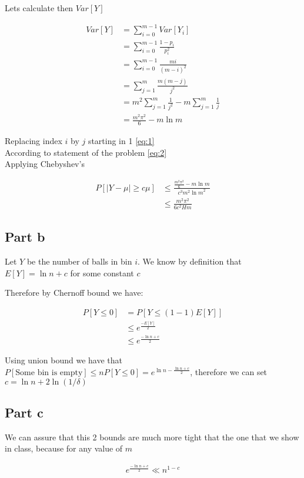 \documentclass[12pt, a4paper]{article}
\begin{document}
Lets calculate then $Var[Y]$

\begin{subequations}
  \begin{align}
  Var[Y] &= \sum_{i=0}^{m-1} Var[Y_i]\\
         &= \sum_{i=0}^{m-1} \frac{1 - p_i}{p_i^2}\\
         &= \sum_{i=0}^{m-1} \frac{mi}{(m - i)^2}\\
         &= \sum_{j=1}^{m} \frac{m(m - j)}{j^2}\label{eq:1} \\
         &= m^2 \sum_{j=1}^{m} \frac{1}{j^2} - m \sum_{j=1}^{m} \frac{1}{j}\label{eq:2}\\
         &= \frac{m^2 \pi^2}{6} - m\ln{m}
  \end{align}
\end{subequations}

Replacing index $i$ by $j$ starting in 1 \ref{eq:1}\\
According to statement of the problem \ref{eq:2}\\

Applying Chebyshev's

\begin{align*}
  P[|Y - \mu| \geq c \mu] &\leq \frac{\frac{m^2 \pi^2}{6} - m\ln{m}}{c^3m^2{\ln{m}}^2}\\
                          &\leq \frac{m^2 \pi^2}{6c^2Hm}
\end{align*}

\subsection{Part b}
Let $Y$ be the number of balls in bin $i$. We know by definition that $E[Y] =
\ln{n} + c$ for some constant $c$

Therefore by Chernoff bound we have:

\begin{align*}
  P[Y \leq 0] &= P[Y \leq (1 - 1)E[Y]]\\
              &\leq e^{\frac{-E[Y]}{2}}\\
              &\leq e^\frac{-\ln{n} + c}{2}
\end{align*}

Using union bound we have that $P[\text{Some bin is empty}] \leq nP[Y \leq 0] =
e^{\ln{n} - \frac{\ln{n} + c}{2}}$, therefore we can set $c = \ln{n} + 2\ln{(1/\delta)}$

\subsection{Part c}
We can assure that this 2 bounds are much more tight that the one that we show
in class, because for any value of $m$

\begin{align*}
  e^\frac{-\ln{n} + c}{2} \ll n^{1-c}
\end{align*}
\end{document}
